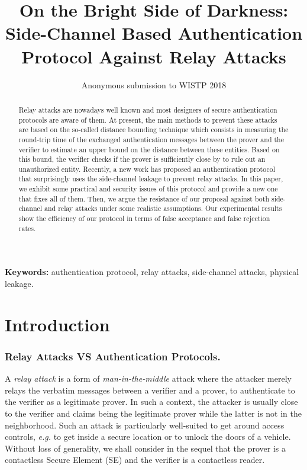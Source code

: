 \documentclass{llncs}
\title{On the Bright Side of Darkness: \\
Side-Channel Based Authentication Protocol Against Relay Attacks}
\author{Anonymous submission to WISTP 2018}
\institute{}
\begin{document}
\maketitle

\begin{abstract}
Relay attacks are nowadays well known and most designers of secure authentication protocols are aware of them. At present, the main methods to prevent these attacks are based on the so-called distance bounding technique which consists in measuring the round-trip time of the exchanged authentication messages between the prover and the verifier to estimate an upper
bound on the distance between these entities. 
Based on this bound, the verifier checks if the prover is sufficiently close by to rule out an unauthorized entity.
Recently, a new work has proposed an authentication protocol that surprisingly uses the side-channel leakage to prevent relay attacks. 
In this paper, we exhibit some practical and security issues of this protocol and provide a new one that fixes all of them. 
Then, we argue the resistance of our proposal against both side-channel and relay attacks under some realistic assumptions. 
Our experimental results show the efficiency of our protocol in terms of false acceptance and false rejection rates.

\end{abstract}
{\bf Keywords:} authentication protocol, relay attacks, side-channel attacks, physical leakage. 

\section{Introduction}
\subsubsection{Relay Attacks VS Authentication Protocols.}
A \textit{relay attack} is a form of \textit{man-in-the-middle} attack where the attacker merely relays the verbatim messages between a verifier and a prover, to authenticate to the verifier as a legitimate prover. In such a context, the attacker is usually close to the verifier and claims being the legitimate prover while the latter is not in the neighborhood. Such an attack is particularly well-suited to get around access controls, \emph{e.g.} to get inside a secure location or to unlock the doors of a vehicle.
Without loss of generality, we shall consider in the sequel that the prover is a contactless Secure Element (SE) and the verifier is a contactless reader. 
\end{document}
